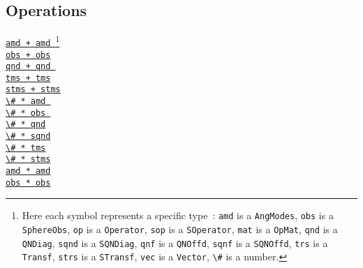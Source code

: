 \documentclass{timesjhep}
\begin{document}
\begin{multicols}{3}
    \subsection*{Operations}
    \noindent 
    \href{}{\lstinline|amd + amd |}\footnote{Here each symbol represents a specific type~: \lstinline[basicstyle=\ttfamily\scriptsize]|amd| is a \lstinline[basicstyle=\ttfamily\scriptsize]|AngModes|,  \lstinline[basicstyle=\ttfamily\scriptsize]|obs| is a \lstinline[basicstyle=\ttfamily\scriptsize]|SphereObs|, \lstinline[basicstyle=\ttfamily\scriptsize]|op| is a \lstinline[basicstyle=\ttfamily\scriptsize]|Operator|, \lstinline[basicstyle=\ttfamily\scriptsize]|sop| is a \lstinline[basicstyle=\ttfamily\scriptsize]|SOperator|, \lstinline[basicstyle=\ttfamily\scriptsize]|mat| is a \lstinline[basicstyle=\ttfamily\scriptsize]|OpMat|, \lstinline[basicstyle=\ttfamily\scriptsize]|qnd| is a \lstinline[basicstyle=\ttfamily\scriptsize]|QNDiag|, \lstinline[basicstyle=\ttfamily\scriptsize]|sqnd| is a  \lstinline[basicstyle=\ttfamily\scriptsize]|SQNDiag|, \lstinline[basicstyle=\ttfamily\scriptsize]|qnf| is a \lstinline[basicstyle=\ttfamily\scriptsize]|QNOffd|, \lstinline[basicstyle=\ttfamily\scriptsize]|sqnf| is a  \lstinline[basicstyle=\ttfamily\scriptsize]|SQNOffd|, \lstinline[basicstyle=\ttfamily\scriptsize]|trs| is a \lstinline[basicstyle=\ttfamily\scriptsize]|Transf|, \lstinline[basicstyle=\ttfamily\scriptsize]|strs| is a \lstinline[basicstyle=\ttfamily\scriptsize]|STransf|, \lstinline[basicstyle=\ttfamily\scriptsize]|vec| is a \lstinline[basicstyle=\ttfamily\scriptsize]|Vector|, \lstinline[basicstyle=\ttfamily\scriptsize]|\#| is a number.}\\
    \href{}{\lstinline|obs + obs|}\\
    \href{}{\lstinline|qnd + qnd |}\\
    \href{}{\lstinline|tms + tms|}\\
    \href{}{\lstinline|stms + stms|}\\
    \href{}{\lstinline|\# * amd |}\\
    \href{}{\lstinline|\# * obs |}\\
    \href{}{\lstinline|\# * qnd|}\\
    \href{}{\lstinline|\# * sqnd|}\\
    \href{}{\lstinline|\# * tms|}\\
    \href{}{\lstinline|\# * stms|}\\
    \href{}{\lstinline|amd * amd|}\\
    \href{}{\lstinline|obs * obs|}\\

\end{multicols}
\end{document}
